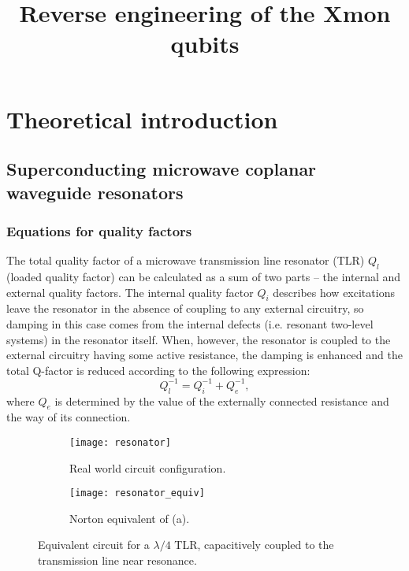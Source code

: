 \documentclass[12pt, twoside]{report}
\title{Reverse engineering of the Xmon qubits}
\numberwithin{equation}{section}
\begin{document}
\maketitle
\tableofcontents

\chapter{Theoretical introduction}

\section{Superconducting microwave coplanar waveguide resonators}

\subsection{Equations for quality factors}

The total quality factor of a microwave transmission line resonator (TLR) $Q_l$ (loaded quality factor) can be calculated as a sum of two parts -- the internal and external quality factors. The internal quality factor $Q_i$ describes how excitations leave the resonator in the absence of coupling to any external circuitry, so damping in this case comes from the internal defects (i.e. resonant two-level systems) in the resonator itself. When, however, the resonator is coupled to the external circuitry having some active resistance, the damping is enhanced and the total Q-factor is reduced according to the following expression:
\begin{equation}
Q_l^{-1} = Q_i^{-1}+Q_e^{-1},
\label{eq:qfactor}
\end{equation}
where $Q_e$ is determined by the value of the externally connected resistance and the way of its connection.

\begin{figure}
\captionsetup[subfigure]{width = 0.9\textwidth, justification=normal}
\centering
\begin{subfigure}[t]{0.48\textwidth}
\centering
\texttt{[image: resonator]}
\caption{Real world circuit configuration.}
\end{subfigure}
\begin{subfigure}[t]{0.48\textwidth}
\centering
\texttt{[image: resonator\_equiv]}
\caption{Norton equivalent of (a).}
\end{subfigure}

\caption{Equivalent circuit for a $\lambda/4$ TLR, capacitively coupled to the transmission line near resonance.}
\label{fig:resonator_equiv}
\end{figure}
\end{document}
